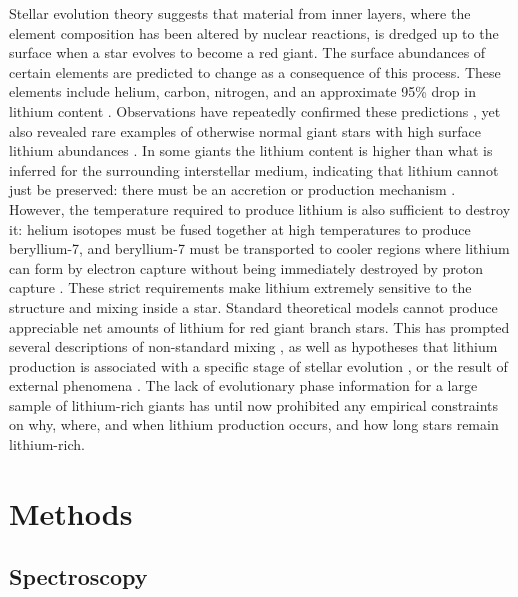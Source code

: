 \documentclass[twocolumn]{aastex62}
\begin{document}
Stellar evolution theory suggests that material from inner layers,
where the element composition has been altered by nuclear reactions, is
dredged up to the surface when a star evolves to become a red giant.
The surface abundances of certain elements are predicted to change as a
consequence of this process. These elements include helium, carbon, nitrogen, and 
an approximate 95\% drop in lithium content \citep{Iben_1967}. Observations have 
repeatedly confirmed these predictions \citep{Lambert_1981,Gilroy_1989,
Kirby_2016}, yet also revealed rare examples of otherwise normal giant stars
with high surface lithium abundances \citep[e.g.,][]{Martell_2013}. In some giants the lithium 
content is higher than what is inferred for the surrounding interstellar medium, indicating that
lithium cannot just be preserved: there must be an accretion or production 
mechanism \citep{Charbonnel_2000}. However, the temperature required to 
produce lithium is also sufficient to destroy it: helium isotopes must be 
fused together at high temperatures to produce beryllium-7, and beryllium-7
must be transported to cooler regions where lithium can form by 
electron capture without being immediately destroyed by proton capture \citep{Cameron_1971}. 
These strict requirements make lithium extremely sensitive to the structure
and mixing inside a star. Standard theoretical models cannot produce
appreciable net amounts of lithium for red giant branch stars. This has prompted several descriptions of
non-standard mixing \citep{Sweigart_1979,Lattanzio_2014,Fekel_1993,Charbonnel_1995,
Sackmann_1999,Charbonnel_2000,Denissenkov_2003}, as well as hypotheses that
lithium production is associated with a specific stage of stellar
evolution \citep{Charbonnel_2000,Kumar_2011,Lattanzio_2014}, or the result 
of external phenomena \citep{Siess_1999,Andrievsky_1999,Denissenkov_2004}. 
The lack of evolutionary phase information for a large sample of
lithium-rich giants has until now prohibited any empirical constraints on why, where, 
and when lithium production occurs, and how long stars remain lithium-rich.


\section{Methods} \label{sec:methods}

\subsection{Spectroscopy}
\end{document}
